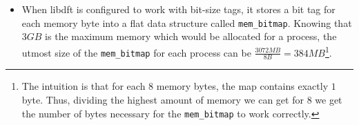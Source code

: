 \documentclass[LaM,binding=0.6cm]{sapthesis}
\begin{document}
\begin{itemize}
Each \texttt{STAB} entry corresponds to a page-size area\footnote{The usual page size in $32$-bits Windows architecture is $4$KB.} and holds a $32$-bits offset used to access all memory addresses inside that page. The virtual address tag is retrieved into two steps (see \autoref{lst:virttobyte}):
\begin{lstlisting} [language={C++}, label={lst:virttobyte}, caption={Code snippet to retrieve the tag byte of any memory address.}]
/*STAB[vaddr >> 12] contains the specific offset of vaddr.*/
offset = STAB[vaddr >> 12];
/*
* taddr is the memory map address
* containing the respective byte tag.
*/
taddr = vaddr + offset;
\end{lstlisting}
\item When libdft is configured to work with bit-size tags, it stores a bit tag for each memory byte into a flat data structure called \texttt{mem\_bitmap}. Knowing that $3GB$ is the maximum memory which would be allocated for a process, the utmost size of the \texttt{mem\_bitmap} for each process can be $\frac{3072MB}{8B} = 384MB$\footnote{The intuition is that for each $8$ memory bytes, the map contains exactly $1$ byte. Thus, dividing the highest amount of memory we can get for $8$ we get the number of bytes necessary for the \texttt{mem\_bitmap} to work correctly.}.\\


\end{itemize}
\end{document}
